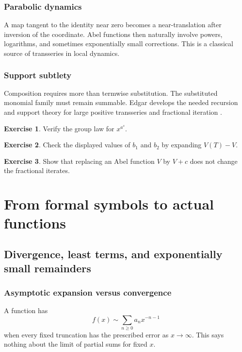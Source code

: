 \documentclass[11pt,oneside,openany]{book}
\theoremstyle{plain}
\theoremstyle{definition}
\newtheorem{exercise}{Exercise}[chapter]
\theoremstyle{remark}
\begin{document}
\section{Parabolic dynamics}
A map tangent to the identity near zero becomes a near-translation after inversion of the coordinate. Abel functions then naturally involve powers, logarithms, and sometimes exponentially small corrections. This is a classical source of transseries in local dynamics.

\section{Support subtlety}
Composition requires more than termwise substitution. The substituted monomial family must remain summable. Edgar develops the needed recursion and support theory for large positive transseries and fractional iteration \cite{EdgarComposition,EdgarFractional}.

\begin{exercise}
Verify the group law for $x^{a^s}$.
\end{exercise}

\begin{exercise}
Check the displayed values of $b_1$ and $b_2$ by expanding $V(T)-V$.
\end{exercise}

\begin{exercise}
Show that replacing an Abel function $V$ by $V+c$ does not change the fractional iterates.
\end{exercise}


\part{From formal symbols to actual functions}

\chapter{Divergence, least terms, and exponentially small remainders}
\label{ch:divergence}

\section{Asymptotic expansion versus convergence}
A function has
\[
  f(x)\sim\sum_{n\ge0}a_nx^{-n-1}
\]
when every fixed truncation has the prescribed error as $x\to\infty$. This says nothing about the limit of partial sums for fixed $x$.
\end{document}
